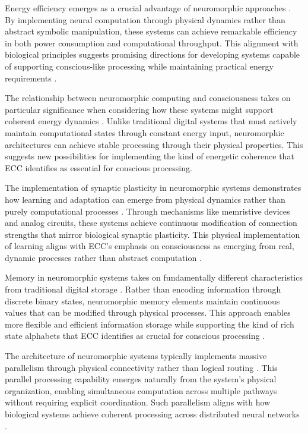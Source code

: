 \begin{refsection}
Energy efficiency emerges as a crucial advantage of neuromorphic approaches \cite{Markovic2020}. By implementing neural computation through physical dynamics rather than abstract symbolic manipulation, these systems can achieve remarkable efficiency in both power consumption and computational throughput. This alignment with biological principles suggests promising directions for developing systems capable of supporting conscious-like processing while maintaining practical energy requirements \cite{Merolla2019}.

The relationship between neuromorphic computing and consciousness takes on particular significance when considering how these systems might support coherent energy dynamics \cite{Neftci2019}. Unlike traditional digital systems that must actively maintain computational states through constant energy input, neuromorphic architectures can achieve stable processing through their physical properties. This suggests new possibilities for implementing the kind of energetic coherence that ECC identifies as essential for conscious processing.

The implementation of synaptic plasticity in neuromorphic systems demonstrates how learning and adaptation can emerge from physical dynamics rather than purely computational processes \cite{Roy2019}. Through mechanisms like memristive devices and analog circuits, these systems achieve continuous modification of connection strengths that mirror biological synaptic plasticity. This physical implementation of learning aligns with ECC's emphasis on consciousness as emerging from real, dynamic processes rather than abstract computation \cite{Schuman2021}.

Memory in neuromorphic systems takes on fundamentally different characteristics from traditional digital storage \cite{Sebastian2020}. Rather than encoding information through discrete binary states, neuromorphic memory elements maintain continuous values that can be modified through physical processes. This approach enables more flexible and efficient information storage while supporting the kind of rich state alphabets that ECC identifies as crucial for conscious processing \cite{Thakur2018}.

The architecture of neuromorphic systems typically implements massive parallelism through physical connectivity rather than logical routing \cite{Wang2018}. This parallel processing capability emerges naturally from the system's physical organization, enabling simultaneous computation across multiple pathways without requiring explicit coordination. Such parallelism aligns with how biological systems achieve coherent processing across distributed neural networks \cite{Yang2019}.


\end{refsection}
